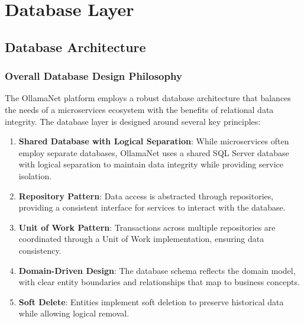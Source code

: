 \def\chapdir{./Chapter05}

\chapter{Database Layer} \label{ch:database-layer}

\section{Database Architecture}

\subsection{Overall Database Design Philosophy}

The OllamaNet platform employs a robust database architecture that balances the needs of a microservices ecosystem with the benefits of relational data integrity. The database layer is designed around several key principles:

\begin{enumerate}
   \item \textbf{Shared Database with Logical Separation}: While microservices often employ separate databases, OllamaNet uses a shared SQL Server database with logical separation to maintain data integrity while providing service isolation.

   \item \textbf{Repository Pattern}: Data access is abstracted through repositories, providing a consistent interface for services to interact with the database.

   \item \textbf{Unit of Work Pattern}: Transactions across multiple repositories are coordinated through a Unit of Work implementation, ensuring data consistency.

   \item \textbf{Domain-Driven Design}: The database schema reflects the domain model, with clear entity boundaries and relationships that map to business concepts.

   \item \textbf{Soft Delete}: Entities implement soft deletion to preserve historical data while allowing logical removal.
\end{enumerate}



